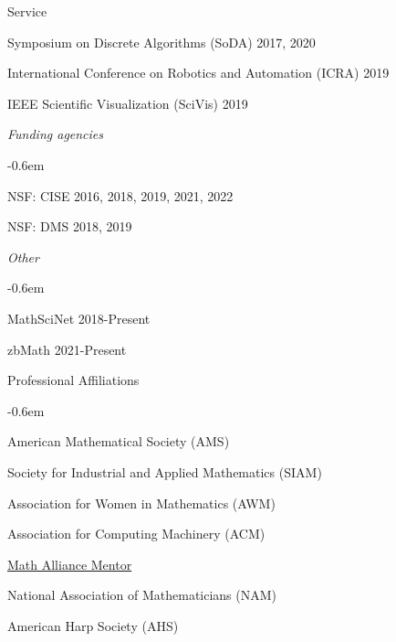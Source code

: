 \documentclass{resume} %
\begin{document}
\begin{rSection}{Service}
\begin{list}{}{\leftmargin=1em}
   \item Symposium on Discrete Algorithms (SoDA) \hfill 2017, 2020
   \item International Conference on Robotics and Automation (ICRA) \hfill 2019
   \item IEEE Scientific Visualization (SciVis) \hfill 2019
\end{list}
\textit{Funding agencies}
\begin{list}{}{\leftmargin=1em}
   \itemsep -0.6em \vspace{-0.5em} %
   \item NSF: CISE  \hfill 2016, 2018, 2019, 2021, 2022
   \item NSF: DMS \hfill 2018, 2019
\end{list}
\textit{Other}
\begin{list}{}{\leftmargin=1em}
   \itemsep -0.6em \vspace{-0.5em} %
   \item MathSciNet \hfill 2018-Present
   \item zbMath \hfill 2021-Present
\end{list}

\end{rSection}
\begin{rSection}{Professional Affiliations}

\begin{list}{}{\leftmargin=0em}
   \itemsep -0.6em %
 \item American Mathematical Society (AMS)
 \item Society for Industrial and Applied Mathematics (SIAM)
 \item Association for Women in Mathematics (AWM)
 \item Association for Computing Machinery (ACM)
 \item \href{https://mathalliance.org/mentor/liz-munch/}{Math Alliance Mentor}
 \item National Association of Mathematicians (NAM)
 \item American Harp Society (AHS)
\end{list}


\end{rSection}
\end{document}
